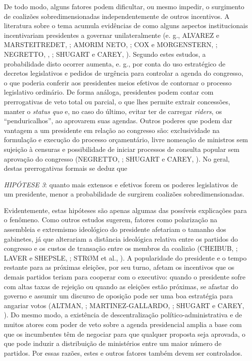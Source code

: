De todo modo, alguns fatores podem dificultar, ou mesmo impedir, o surgimento de coalizões sobredimensionadas independentemente de outros incentivos. A literatura sobre o tema acumula evidências de como alguns aspectos institucionais incentivariam presidentes a governar unilateralmente (e. g., ALVAREZ e MARSTEITREDET, \citeyear{alvarez2010}; AMORIM NETO, \citeyear{neto2006}; COX e MORGENSTERN, \citeyear{cox2001}; NEGRETTO, \citeyear{negretto2004}, \citeyear{negretto2006}; SHUGART e CAREY, \citeyear{shugart1992}). Segundo estes estudos, a probabilidade disto ocorrer aumenta, e. g., por conta do uso estratégico de decretos legislativos e pedidos de urgência para controlar a agenda do congresso, o que poderia conferir aos presidentes meios efetivos de contornar o processo legislativo ordinário. De forma análoga, presidentes podem contar com prerrogativas de veto total ou parcial, o que lhes permite extrair concessões, manter o \textit{status quo} e, no caso do último, evitar ter de carregar \textit{riders}, os “penduricalhos”, ao aprovarem suas agendas. Outros poderes que podem dar vantagem a um presidente em relação ao congresso são: exclusividade na formulação e execução do processo orçamentário, livre nomeação de ministros sem sujeição à censuras e possibilidade de iniciar processos de consulta popular sem aprovação do congresso (NEGRETTO, \citeyear{negretto2013}; SHUGART e CAREY, \citeyear{shugart1992}). No geral, destas prerrogativas formais se deduz que

\vspace*{1\baselineskip}\vspace*{-\parskip}
\noindent
\textit{HIPÓTESE 3}: quanto mais extensos e efetivos forem os poderes legislativos de um presidente, menor a probabilidade de surgirem coalizões sobredimensionadas.
\vspace*{1\baselineskip}

Evidentemente, estas hipóteses são apenas algumas das possíveis explicações para o fenômeno. Como outros estudos sugerem, fatores como polarização na assembleia e extremismo ideológico do presidente afetariam o tamanho dos gabinetes, já que alterariam a distância ideológica relativa entre os partidos do congresso e os custos de transação entre os membros da coalizão (CHEIBUB, \citeyear{cheibub2007}; LAVER e SHEPSLE, \citeyear{laver1996}; STR\O{}M et al., \citeyear{strom2010}). A popularidade do presidente e o tempo restante para as próximas eleições, por seu turno, afetam os incentivos que os demais partidos teriam para cooperar com o executivo: quando o presidente sofre com altas taxas de rejeição ou quando as eleições estão próximas, se afastar do governo e assumir um discurso de oposição pode ser uma boa estratégia para angariar votos (ALTMAN, \citeyear{altman2000}; MARTINEZ-GALLARDO, \citeyear{martinez2012}; SHUGART e CAREY, \citeyear{shugart1992}). Do mesmo modo, a existência de descentralização político-administrativa e de muitos atores com poder de veto sobre a agenda presidencial amplia a base com que os incumbentes têm de negociar para que qualquer proposta seja aprovada, o que pode induzir a distribuição de ministérios entre um maior número de partidos. Por essas razões, estes e outros fatores também devem ser controlados. 

